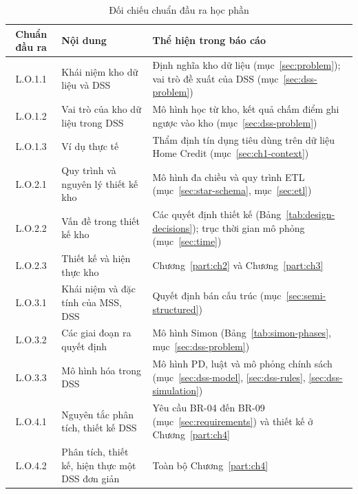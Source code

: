 \begin{table}[H]
	\centering
	\caption{Đối chiếu chuẩn đầu ra học phần}
	\label{tab:lo-coverage}
	\footnotesize
	\begin{tabular}{c p{} p{}}
		\toprule
		\textbf{Chuẩn đầu ra} & \textbf{Nội dung}                               & \textbf{Thể hiện trong báo cáo}                                                                                  \\
		\midrule
		L.O.1.1               & Khái niệm kho dữ liệu và DSS                    & Định nghĩa kho dữ liệu (mục~\ref{sec:problem}); vai trò đề xuất của DSS (mục~\ref{sec:dss-problem})              \\
		L.O.1.2               & Vai trò của kho dữ liệu trong DSS               & Mô hình học từ kho, kết quả chấm điểm ghi ngược vào kho (mục~\ref{sec:dss-problem})                              \\
		L.O.1.3               & Ví dụ thực tế                                   & Thẩm định tín dụng tiêu dùng trên dữ liệu Home Credit (mục~\ref{sec:ch1-context})                                \\
		L.O.2.1               & Quy trình và nguyên lý thiết kế kho             & Mô hình đa chiều và quy trình ETL (mục~\ref{sec:star-schema}, mục~\ref{sec:etl})                                 \\
		L.O.2.2               & Vấn đề trong thiết kế kho                       & Các quyết định thiết kế (Bảng~\ref{tab:design-decisions}); trục thời gian mô phỏng (mục~\ref{sec:time})          \\
		L.O.2.3               & Thiết kế và hiện thực kho                       & Chương~\ref{part:ch2} và Chương~\ref{part:ch3}                                                                   \\
		L.O.3.1               & Khái niệm và đặc tính của MSS, DSS              & Quyết định bán cấu trúc (mục~\ref{sec:semi-structured})                                                          \\
		L.O.3.2               & Các giai đoạn ra quyết định                     & Mô hình Simon (Bảng~\ref{tab:simon-phases}, mục~\ref{sec:dss-problem})                                           \\
		L.O.3.3               & Mô hình hóa trong DSS                           & Mô hình PD, luật và mô phỏng chính sách (mục~\ref{sec:dss-model}, \ref{sec:dss-rules}, \ref{sec:dss-simulation}) \\
		L.O.4.1               & Nguyên tắc phân tích, thiết kế DSS              & Yêu cầu BR-04 đến BR-09 (mục~\ref{sec:requirements}) và thiết kế ở Chương~\ref{part:ch4}                         \\
		L.O.4.2               & Phân tích, thiết kế, hiện thực một DSS đơn giản & Toàn bộ Chương~\ref{part:ch4}                                                                                    \\
		\bottomrule
	\end{tabular}
\end{table}

